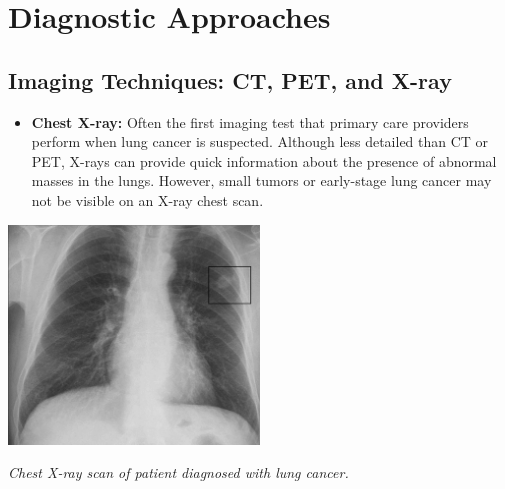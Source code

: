 
\section{Diagnostic Approaches}


\subsection{Imaging Techniques: CT, PET, and X-ray}

\begin{itemize}
    \item \textbf{Chest X-ray:} Often the first imaging test that primary care providers perform 
    when lung cancer is suspected. Although less detailed than CT or PET, X-rays can provide quick 
    information about the presence of abnormal masses in the lungs. However, small tumors or 
    early-stage lung cancer may not be visible on an X-ray chest scan. \cite{lung_cancer_diagnosis}
\end{itemize}

\vspace{1em}
\begin{center}
    \includegraphics[width=0.5\textwidth]{../assets/04-diagnosis/lc-x-ray.png}
    
    \small\textit{Chest X-ray scan of patient diagnosed with lung cancer. \cite{inbook}}
\end{center}
\vspace{1em}

